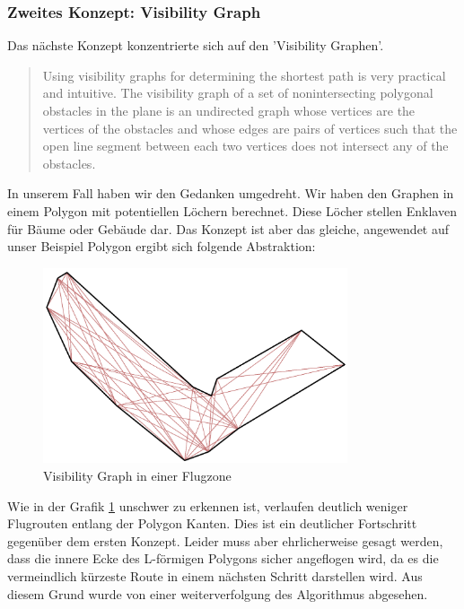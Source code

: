\newpage
\subsubsection{Zweites Konzept: Visibility Graph}
Das nächste Konzept konzentrierte sich auf den 'Visibility Graphen'. 
\cite[p.1]{IEEEPaper} 
\blockquote{Using visibility graphs for determining the shortest path is very practical and intuitive. The visibility graph of a set of nonintersecting polygonal obstacles in the plane is an undirected graph whose vertices are the vertices of the obstacles and whose edges are pairs of vertices such that the open line segment between each two vertices does not intersect any of the obstacles.}
In unserem Fall haben wir den Gedanken umgedreht. Wir haben den Graphen in einem Polygon mit potentiellen Löchern berechnet. Diese Löcher stellen Enklaven für Bäume oder Gebäude dar. Das Konzept ist aber das gleiche, angewendet auf unser Beispiel Polygon ergibt sich folgende Abstraktion:
\begin{figure}[h]
	\centering
	\includegraphics[width=0.8\textwidth]{images/routing/visibilityGraph.png}
	\caption{Visibility Graph in einer Flugzone}
	\label{fig:visibility-graph}
\end{figure}
Wie in der Grafik \ref{fig:visibility-graph} unschwer zu erkennen ist, verlaufen deutlich weniger Flugrouten entlang der Polygon Kanten. 
Dies ist ein deutlicher Fortschritt gegenüber dem ersten Konzept. Leider muss aber ehrlicherweise gesagt werden, dass die innere Ecke des L-förmigen Polygons sicher angeflogen wird, da es die vermeindlich kürzeste Route in einem nächsten Schritt darstellen wird. Aus diesem Grund wurde von einer weiterverfolgung des Algorithmus abgesehen.
\\
